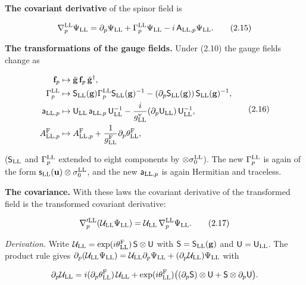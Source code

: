 \documentclass[
  10pt,
]{article}
\begin{document}
\textbf{The covariant derivative} of the spinor field is

\[\nabla^{\rm LL}_p\Psi_{\rm LL}=\partial_p\Psi_{\rm LL}+\Gamma^{\rm LL}_p\Psi_{\rm LL}-i\,\mathsf A_{{\rm LL},p}\Psi_{\rm LL}.\tag{2.15}\]

\textbf{The transformations of the gauge fields.} Under (2.10) the gauge
fields change as

\[\begin{aligned}
\mathbf f_p&\mapsto\tilde{\mathbf g}\,\mathbf f_p\,\tilde{\mathbf g}^\dagger,\\
\Gamma^{\rm LL}_p&\mapsto\mathsf S_{\rm LL}(\mathbf g)\Gamma^{\rm LL}_p\mathsf S_{\rm LL}(\mathbf g)^{-1}-(\partial_p\mathsf S_{\rm LL}(\mathbf g))\,\mathsf S_{\rm LL}(\mathbf g)^{-1},\\
\mathsf a_{{\rm LL},p}&\mapsto\mathsf U_{\rm LL}\,\mathsf a_{{\rm LL},p}\,\mathsf U_{\rm LL}^{-1}-\frac{i}{g^{\rm v}_{\rm LL}}(\partial_p\mathsf U_{\rm LL})\,\mathsf U_{\rm LL}^{-1},\\
A^{\rm F}_{{\rm LL},p}&\mapsto A^{\rm F}_{{\rm LL},p}+\frac{1}{g^{\rm F}_{\rm LL}}\partial_p\theta^{\rm F}_{\rm LL},
\end{aligned}\tag{2.16}\]

(\(\mathsf S_{\rm LL}\) and \(\Gamma^{\rm LL}_p\) extended to eight
components by \(\otimes\sigma^{\rm LL}_0\)). The new
\(\Gamma^{\rm LL}_p\) is again of the form
\(\mathsf s_{\rm LL}(\mathbf u)\otimes\sigma^{\rm LL}_0\), and the new
\(\mathsf a_{{\rm LL},p}\) is again Hermitian and traceless.

\textbf{The covariance.} With these laws the covariant derivative of the
transformed field is the transformed covariant derivative:

\[\nabla'^{\rm LL}_p(\mathcal U_{\rm LL}\Psi_{\rm LL})=\mathcal U_{\rm LL}\,\nabla^{\rm LL}_p\Psi_{\rm LL}.\tag{2.17}\]

\emph{Derivation.} Write
\(\mathcal U_{\rm LL}=\exp(i\theta^{\rm F}_{\rm LL})\,\mathsf S\otimes\mathsf U\)
with \(\mathsf S=\mathsf S_{\rm LL}(\mathbf g)\) and
\(\mathsf U=\mathsf U_{\rm LL}\). The product rule gives
\(\partial_p(\mathcal U_{\rm LL}\Psi_{\rm LL})=\mathcal U_{\rm LL}\partial_p\Psi_{\rm LL}+(\partial_p\mathcal U_{\rm LL})\Psi_{\rm LL}\)
with

\[\partial_p\mathcal U_{\rm LL}=i(\partial_p\theta^{\rm F}_{\rm LL})\,\mathcal U_{\rm LL}+\exp(i\theta^{\rm F}_{\rm LL})\big((\partial_p\mathsf S)\otimes\mathsf U+\mathsf S\otimes\partial_p\mathsf U\big).\]
\end{document}
